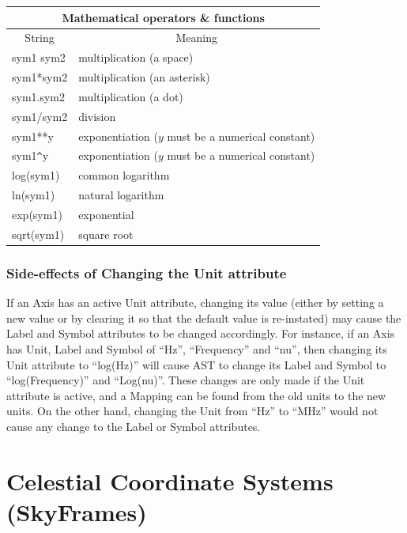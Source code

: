 \documentclass[twoside,11pt]{article}
\begin{document}
\begin{center}
\begin{tabular}{|l|l|}
\hline
\multicolumn{2}{|c|}{{\large Mathematical operators \& functions}} \\
\hline
\multicolumn{1}{|c|}{String} & \multicolumn{1}{|c|}{Meaning} \\ \hline
sym1 sym2           & multiplication (a space) \\ 
sym1*sym2           & multiplication (an asterisk) \\
sym1.sym2           & multiplication (a dot) \\
sym1/sym2           & division \\
sym1**y             & exponentiation ($y$ must be a numerical constant)\\
sym1\verb+^+y       & exponentiation ($y$ must be a numerical constant)\\
log(sym1)           & common logarithm \\
ln(sym1)            & natural logarithm \\
exp(sym1)           & exponential \\
sqrt(sym1)          & square root \\
\hline
\end{tabular}
\end{center}

\subsubsection{Side-effects of Changing the Unit attribute}
If an Axis has an active Unit attribute, changing its value (either by 
setting a new value or by clearing it so that the default value is 
re-instated) may cause the Label and Symbol attributes to be changed
accordingly. For instance, if an Axis has Unit, Label and Symbol of ``Hz'',
``Frequency'' and ``nu'', then changing its Unit attribute to ``log(Hz)''
will cause AST to change its Label and Symbol to ``log(Frequency)'' and 
``Log(nu)''. These changes are only made if the Unit attribute is active,
and a Mapping can be found from the old units to the new units. On the other
 hand, changing the Unit from ``Hz'' to ``MHz'' would not cause any change 
to the Label or Symbol attributes.

\cleardoublepage
\section{\label{ss:skyframes}Celestial Coordinate Systems (SkyFrames)}
\end{document}
